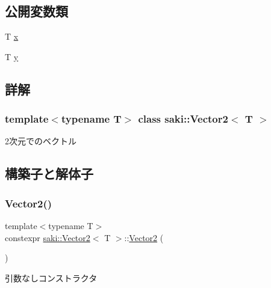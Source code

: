 \subsection*{公開変数類}
\begin{DoxyCompactItemize}
\item 
T \mbox{\hyperlink{classsaki_1_1_vector2_a69df7df6da198f35ef8ed269eb095c27}{x}}
\item 
T \mbox{\hyperlink{classsaki_1_1_vector2_a54e83290254fb653eff9b8dcf6a10878}{y}}
\end{DoxyCompactItemize}


\subsection{詳解}
\subsubsection*{template$<$typename T$>$\newline
class saki\+::\+Vector2$<$ T $>$}

2次元でのベクトル 

\subsection{構築子と解体子}
\mbox{\label{classsaki_1_1_vector2_af57b72f4255812a361bef1922a226f86}} 
\subsubsection{\texorpdfstring{Vector2()}{Vector2()}\hspace{0.1cm}{\footnotesize\ttfamily [1/4]}}
{\footnotesize\ttfamily template$<$typename T$>$ \\
constexpr \mbox{\hyperlink{classsaki_1_1_vector2}{saki\+::\+Vector2}}$<$ T $>$\+::\mbox{\hyperlink{classsaki_1_1_vector2}{Vector2}} (\begin{DoxyParamCaption}{ }\end{DoxyParamCaption})\hspace{0.3cm}{\ttfamily [inline]}}



引数なしコンストラクタ 

\mbox{\label{classsaki_1_1_vector2_ad0f3d0a05370f1ef4947520245f6e9a8}} 
